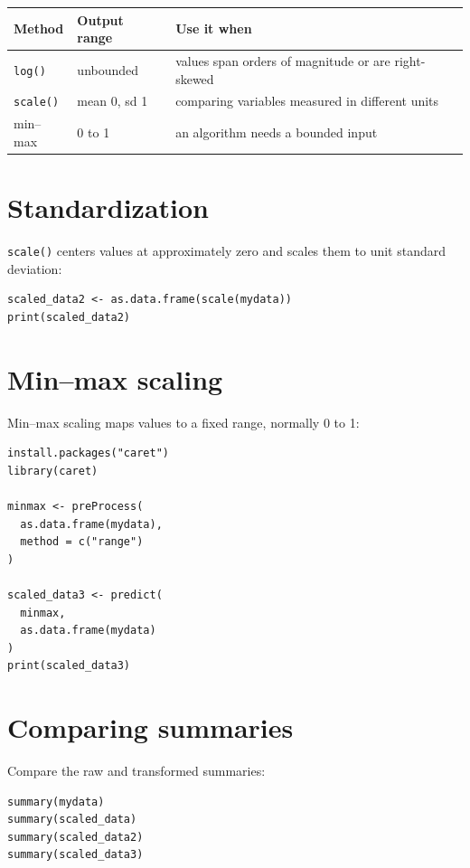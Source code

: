 \begin{center}
\begin{tabularx}{\linewidth}{@{}p{2.5cm}p{2.9cm}X@{}}
\toprule
\rowcolor{DSPaleBlue!92}
Method & Output range & Use it when \\
\midrule
\texttt{log()} & unbounded & values span orders of magnitude or are right-skewed \\
\texttt{scale()} & mean 0, sd 1 & comparing variables measured in different units \\
min--max & 0 to 1 & an algorithm needs a bounded input \\
\bottomrule
\end{tabularx}
\end{center}

\section{Standardization}

\texttt{scale()} centers values at approximately zero and scales them to unit standard deviation:

\begin{lstlisting}[style=dsr]
scaled_data2 <- as.data.frame(scale(mydata))
print(scaled_data2)
\end{lstlisting}


\section{Min--max scaling}

Min--max scaling maps values to a fixed range, normally 0 to 1:

\begin{lstlisting}[style=dsr]
install.packages("caret")
library(caret)

minmax <- preProcess(
  as.data.frame(mydata),
  method = c("range")
)

scaled_data3 <- predict(
  minmax,
  as.data.frame(mydata)
)
print(scaled_data3)
\end{lstlisting}

\section{Comparing summaries}

Compare the raw and transformed summaries:

\begin{lstlisting}[style=dsr]
summary(mydata)
summary(scaled_data)
summary(scaled_data2)
summary(scaled_data3)
\end{lstlisting}

